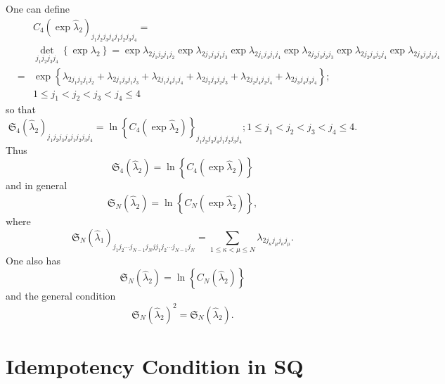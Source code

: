 \documentclass[12pt]{article}
\begin{document}
One can define 
\begin{eqnarray*}
&&C_{4}\left( \exp \hat{\lambda}_{2}\right)
_{j_{1}j_{2}j_{3}j_{4}j_{1}j_{2}j_{3}j_{4}}= \\
&&\det_{j_{1}j_{2}j_{3}j_{4}}\left\{ \exp \lambda _{2}\right\} =\exp \lambda
_{2j_{1}j_{2}j_{1}j_{2}}\exp \lambda _{2j_{1}j_{3}j_{1}j_{3}}\exp \lambda
_{2j_{1}j_{4}j_{1}j_{4}}\exp \lambda _{2j_{2}j_{3}j_{2}j_{3}}\exp \lambda
_{2j_{2}j_{4}j_{2}j_{4}}\exp \lambda _{2j_{3}j_{4}j_{3}j_{4}} \\
&=&\exp \left\{ \lambda _{2j_{1}j_{2}j_{1}j_{2}}+\lambda
_{2j_{1}j_{3}j_{1}j_{3}}+\lambda _{2j_{1}j_{4}j_{1}j_{4}}+\lambda
_{2j_{2}j_{3}j_{2}j_{3}}+\lambda _{2j_{2}j_{4}j_{2}j_{4}}+\lambda
_{2j_{3}j_{4}j_{3}j_{4}}\right\} ; \\
&&1\leq j_{1}<j_{2}<j_{3}<j_{4}\leq 4
\end{eqnarray*}%
so that%
\begin{equation*}
\mathfrak{S}_{4}\left( \hat{\lambda}_{2}\right)
_{j_{1}j_{2}j_{3}j_{4}j_{1}j_{2}j_{3}j_{4}}=\ln \left\{ C_{4}\left( \exp 
\hat{\lambda}_{2}\right) \right\}
_{j_{1}j_{2}j_{3}j_{4}j_{1}j_{2}j_{3}j_{4}};1\leq
j_{1}<j_{2}<j_{3}<j_{4}\leq 4.
\end{equation*}%
Thus 
\begin{equation*}
\mathfrak{S}_{4}\left( \hat{\lambda}_{2}\right) =\ln \left\{ C_{4}\left(
\exp \hat{\lambda}_{2}\right) \right\}
\end{equation*}%
and in general 
\begin{equation*}
\mathfrak{S}_{N}\left( \hat{\lambda}_{2}\right) =\ln \left\{ C_{N}\left(
\exp \hat{\lambda}_{2}\right) \right\} ,
\end{equation*}%
where 
\begin{equation*}
\mathfrak{S}_{N}\left( \hat{\lambda}_{1}\right) _{j_{1}j_{2}\cdots
j_{N-1}j_{N}jj_{1}j_{2}\cdots j_{N-1}j_{N}}=\sum_{1\leq \kappa <\mu \leq
N}\lambda _{2j_{\kappa }j_{\mu }j_{\kappa }j_{\mu }}.
\end{equation*}%
One also has%
\begin{equation*}
\mathfrak{S}_{N}\left( \hat{\lambda}_{2}\right) =\ln \left\{ C_{N}\left( 
\hat{\lambda}_{2}\right) \right\}
\end{equation*}%
and the general condition 
\begin{equation*}
\mathfrak{S}_{N}\left( \hat{\lambda}_{2}\right) ^{2}=\mathfrak{S}_{N}\left( 
\hat{\lambda}_{2}\right) .
\end{equation*}

\section{Idempotency Condition in SQ}
\end{document}
